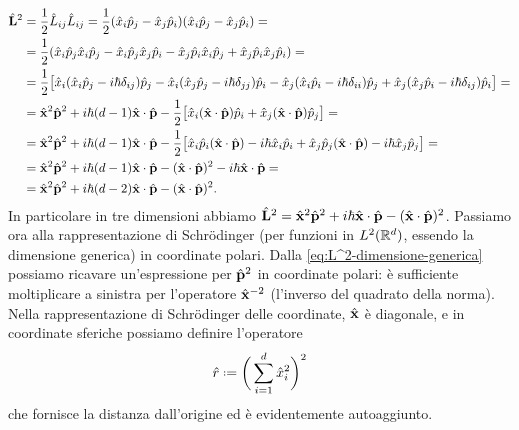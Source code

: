 \begin{equation}
	\begin{split}
		\op{\vec L}^2&=\frac12\op L_{ij}\op L_{ij}=\frac12(\op x_i\op p_j-\op x_j\op p_i)(\op x_i\op p_j-\op x_j\op p_i)=\\
		&=\frac12(\op x_i\op p_j\op x_i\op p_j-\op x_i\op p_j\op x_j\op p_i-\op x_j\op p_i\op x_i\op p_j+\op x_j\op p_i\op x_j\op p_i)=\\
		&=\frac12\big[\op x_i(\op x_i\op p_j-i\hbar\delta_{ij})\op p_j-\op x_i(\op x_j\op p_j-i\hbar\delta_{jj})\op p_i-\op x_j(\op x_i\op p_i-i\hbar\delta_{ii})\op p_j+\op x_j(\op x_j\op p_i-i\hbar\delta_{ij})\op p_i\big]=\\
	&=\op{\vec x}^2\op{\vec p}^2+i\hbar(d-1)\scalar{\op{\vec x}}{\op{\vec p}}-\frac12\big[\op x_i(\scalar{\op{\vec x}}{\op{\vec p}})\op p_i+\op x_j(\scalar{\op{\vec x}}{\op{\vec p}})\op p_j\big]=\\
	&=\op{\vec x}^2\op{\vec p}^2+i\hbar(d-1)\scalar{\op{\vec x}}{\op{\vec p}}-\frac12\big[\op x_i\op p_i(\scalar{\op{\vec x}}{\op{\vec p}})-i\hbar \op x_i\op p_i+\op x_j\op p_j(\scalar{\op{\vec x}}{\op{\vec p}})-i\hbar \op x_j\op p_j\big]=\\
		&=\op{\vec x}^2\op{\vec p}^2+i\hbar(d-1)\scalar{\op{\vec x}}{\op{\vec p}}-(\scalar{\op{\vec x}}{\op{\vec p}})^2-i\hbar\scalar{\op{\vec x}}{\op{\vec p}}=\\
		&=\op{\vec x}^2\op{\vec p}^2+i\hbar(d-2)\scalar{\op{\vec x}}{\op{\vec p}}-(\scalar{\op{\vec x}}{\op{\vec p}})^2.
	\end{split}
	\label{eq:L^2-dimensione-generica}
\end{equation}
In particolare in tre dimensioni abbiamo $\op{\vec L}^2=\op{\vec x}^2\op{\vec p}^2+i\hbar\scalar{\op{\vec x}}{\op{\vec p}}-(\scalar{\op{\vec x}}{\op{\vec p}})^2$.
Passiamo ora alla rappresentazione di Schr\"odinger (per funzioni in $\leb[2]{\R^d}$, essendo la dimensione generica) in coordinate polari.
Dalla \eqref{eq:L^2-dimensione-generica} possiamo ricavare un'espressione per $\op{\vec p}^2$ in coordinate polari: è sufficiente moltiplicare a sinistra per l'operatore $\op{\vec x}^{-2}$ (l'inverso del quadrato della norma).
Nella rappresentazione di Schr\"odinger delle coordinate, $\op{\vec x}$ è diagonale, e in coordinate sferiche possiamo definire l'operatore
\begin{equation}
	\op r\defeq\bigg(\sum_{i=1}^d\op x_i^2\bigg)^2
	\label{eq:operatore-raggio}
\end{equation}
che fornisce la distanza dall'origine ed è evidentemente autoaggiunto.
